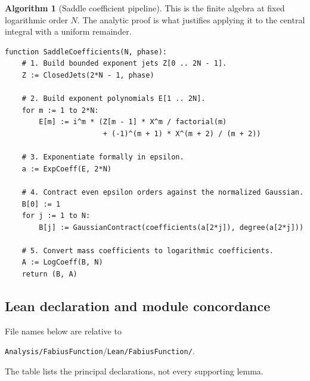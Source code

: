 \documentclass[11pt,oneside]{article}
\theoremstyle{definition}
\newtheorem{algorithm}[algorithm]{Algorithm}
\theoremstyle{remark}
\newcommand{\repo}{\nolinkurl{Analysis/FabiusFunction}}
\begin{document}
\begin{algorithm}[Saddle coefficient pipeline]
\label{integration:alg:saddle-pipeline}
This is the finite algebra at fixed logarithmic order $N$.  The analytic proof is what
justifies applying it to the central integral with a uniform remainder.
\end{algorithm}
\begin{lstlisting}[style=pseudo]
function SaddleCoefficients(N, phase):
    # 1. Build bounded exponent jets Z[0 .. 2N - 1].
    Z := ClosedJets(2*N - 1, phase)

    # 2. Build exponent polynomials E[1 .. 2N].
    for m := 1 to 2*N:
        E[m] := i^m * (Z[m - 1] * X^m / factorial(m)
                       + (-1)^(m + 1) * X^(m + 2) / (m + 2))

    # 3. Exponentiate formally in epsilon.
    a := ExpCoeff(E, 2*N)

    # 4. Contract even epsilon orders against the normalized Gaussian.
    B[0] := 1
    for j := 1 to N:
        B[j] := GaussianContract(coefficients(a[2*j]), degree(a[2*j]))

    # 5. Convert mass coefficients to logarithmic coefficients.
    A := LogCoeff(B, N)
    return (B, A)
\end{lstlisting}

\subsection{Lean declaration and module concordance}
\label{integration:app:concordance}

File names below are relative to
\begin{center}
 \repo/\texttt{Lean/FabiusFunction/}.
\end{center}
The table lists the principal declarations, not every supporting lemma.
\end{document}
